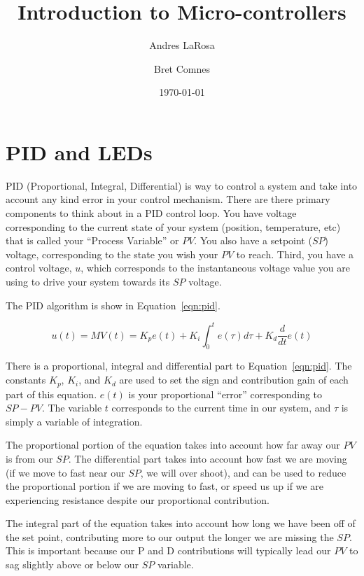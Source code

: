 \documentclass[11pt,a4paper]{article}
\begin{document}
\title{Introduction to Micro-controllers}
\date{\today} 
\author{Andres LaRosa}
\author{Bret Comnes}
\maketitle

\section{PID and LEDs} %
\label{sec:pid_and_leds}

PID (Proportional, Integral, Differential) is way to control a system and take into account any kind error in your control mechanism.   There are there primary components to think about in a PID control loop. You have voltage corresponding to the current state of your system (position, temperature, etc) that is called your ``Process Variable'' or $PV$.  You also have a setpoint ($SP$) voltage, corresponding to the state you wish your $PV$ to reach.  Third, you have a control voltage, $u$, which corresponds to the instantaneous voltage value you are using to drive your system towards its $SP$ voltage.

The PID algorithm is show in Equation~\ref{eqn:pid}.


\begin{equation}
    \label{eqn:pid}
    u(t) = MV(t) = K_{p} e(t) + K_{i} \int _{0}^t e(\tau)d\tau + K_{d} \frac{d}{dt}e(t)
\end{equation}

There is a proportional, integral and differential part to Equation~\ref{eqn:pid}.  The constants $K_{p}$, $K_{i}$, and $K_{d}$ are used to set the sign and contribution gain of each part of this equation.  $e(t)$ is your proportional ``error'' corresponding to $SP - PV$.  The variable $t$ corresponds to the current time in our system, and $\tau$ is simply a variable of integration.  

The proportional portion of the equation takes into account how far away our $PV$ is from our $SP$.  The differential part takes into account how fast we are moving (if we move to fast near our $SP$, we will over shoot), and can be used to reduce the proportional portion if we are moving to fast, or speed us up if we are experiencing resistance despite our proportional contribution.  

The integral part of the equation takes into account how long we have been off of the set point, contributing more to our output the longer we are missing the $SP$.  This is important because our P and D contributions will typically lead our $PV$ to sag slightly above or below our $SP$ variable.\cite{pid}
\end{document}
